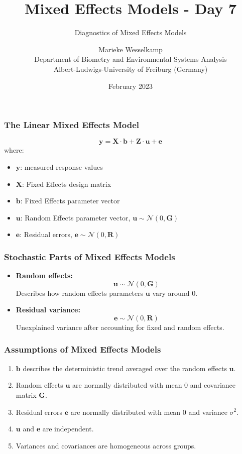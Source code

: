 \documentclass{beamer}
\title{Mixed Effects Models - Day 7}
\subtitle{Diagnostics of Mixed Effects Models}
\author{Marieke Wesselkamp\\Department of Biometry and Environmental Systems Analysis\\Albert-Ludwigs-University of Freiburg (Germany)}
\date{February 2023}
\begin{document}
\frame{\titlepage}

\begin{frame}
    \frametitle{The Linear Mixed Effects Model}
    \[
    \mathbf{y} = \mathbf{X} \cdot \mathbf{b} + \mathbf{Z} \cdot \mathbf{u} + \mathbf{e}
    \]
    where:
    \begin{itemize}
        \item $\mathbf{y}$: measured response values
        \item $\mathbf{X}$: Fixed Effects design matrix
        \item $\mathbf{b}$: Fixed Effects parameter vector
        \item $\mathbf{u}$: Random Effects parameter vector, $\mathbf{u} \sim \mathcal{N}(0, \mathbf{G})$
        \item $\mathbf{e}$: Residual errors, $\mathbf{e} \sim \mathcal{N}(0, \mathbf{R})$
    \end{itemize}
\end{frame}

\begin{frame}
    \frametitle{Stochastic Parts of Mixed Effects Models}
    \begin{itemize}
        \item \textbf{Random effects:} 
        \[
        \mathbf{u} \sim \mathcal{N}(0, \mathbf{G})
        \]
        Describes how random effects parameters $\mathbf{u}$ vary around 0.
        
        \item \textbf{Residual variance:} 
        \[
        \mathbf{e} \sim \mathcal{N}(0, \mathbf{R})
        \]
        Unexplained variance after accounting for fixed and random effects.
    \end{itemize}
\end{frame}

\begin{frame}
    \frametitle{Assumptions of Mixed Effects Models}
    \begin{enumerate}
        \item $\mathbf{b}$ describes the deterministic trend averaged over the random effects $\mathbf{u}$.
        \item Random effects $\mathbf{u}$ are normally distributed with mean 0 and covariance matrix $\mathbf{G}$.
        \item Residual errors $\mathbf{e}$ are normally distributed with mean 0 and variance $\sigma^2$.
        \item $\mathbf{u}$ and $\mathbf{e}$ are independent.
        \item Variances and covariances are homogeneous across groups.
    \end{enumerate}
\end{frame}
\end{document}
